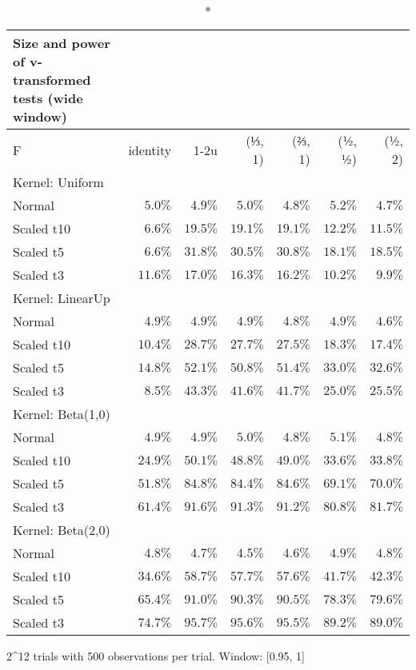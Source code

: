 \setlength{\LTpost}{0mm}
\begin{longtable}{lrrrrrr}
\caption*{
{\large Size and power of v-transformed tests (wide window)}
} \\ 
\toprule
F & identity & \textbar{}1-2u\textbar{} & (⅓, 1) & (⅔, 1) & (½, ½) & (½, 2) \\ 
\midrule
\multicolumn{7}{l}{Kernel: Uniform} \\ 
\midrule
Normal & $5.0\%$ & $4.9\%$ & $5.0\%$ & $4.8\%$ & $5.2\%$ & $4.7\%$ \\ 
Scaled t10 & $6.6\%$ & $19.5\%$ & $19.1\%$ & $19.1\%$ & $12.2\%$ & $11.5\%$ \\ 
Scaled t5 & $6.6\%$ & $31.8\%$ & $30.5\%$ & $30.8\%$ & $18.1\%$ & $18.5\%$ \\ 
Scaled t3 & $11.6\%$ & $17.0\%$ & $16.3\%$ & $16.2\%$ & $10.2\%$ & $9.9\%$ \\ 
\midrule
\multicolumn{7}{l}{Kernel: LinearUp} \\ 
\midrule
Normal & $4.9\%$ & $4.9\%$ & $4.9\%$ & $4.8\%$ & $4.9\%$ & $4.6\%$ \\ 
Scaled t10 & $10.4\%$ & $28.7\%$ & $27.7\%$ & $27.5\%$ & $18.3\%$ & $17.4\%$ \\ 
Scaled t5 & $14.8\%$ & $52.1\%$ & $50.8\%$ & $51.4\%$ & $33.0\%$ & $32.6\%$ \\ 
Scaled t3 & $8.5\%$ & $43.3\%$ & $41.6\%$ & $41.7\%$ & $25.0\%$ & $25.5\%$ \\ 
\midrule
\multicolumn{7}{l}{Kernel: Beta(1,0)} \\ 
\midrule
Normal & $4.9\%$ & $4.9\%$ & $5.0\%$ & $4.8\%$ & $5.1\%$ & $4.8\%$ \\ 
Scaled t10 & $24.9\%$ & $50.1\%$ & $48.8\%$ & $49.0\%$ & $33.6\%$ & $33.8\%$ \\ 
Scaled t5 & $51.8\%$ & $84.8\%$ & $84.4\%$ & $84.6\%$ & $69.1\%$ & $70.0\%$ \\ 
Scaled t3 & $61.4\%$ & $91.6\%$ & $91.3\%$ & $91.2\%$ & $80.8\%$ & $81.7\%$ \\ 
\midrule
\multicolumn{7}{l}{Kernel: Beta(2,0)} \\ 
\midrule
Normal & $4.8\%$ & $4.7\%$ & $4.5\%$ & $4.6\%$ & $4.9\%$ & $4.8\%$ \\ 
Scaled t10 & $34.6\%$ & $58.7\%$ & $57.7\%$ & $57.6\%$ & $41.7\%$ & $42.3\%$ \\ 
Scaled t5 & $65.4\%$ & $91.0\%$ & $90.3\%$ & $90.5\%$ & $78.3\%$ & $79.6\%$ \\ 
Scaled t3 & $74.7\%$ & $95.7\%$ & $95.6\%$ & $95.5\%$ & $89.2\%$ & $89.0\%$ \\ 
\bottomrule
\end{longtable}
\begin{minipage}{\linewidth}
2\textasciicircum{}12 trials with 500 observations per trial. Window: [0.95, 1]\\
\end{minipage}

